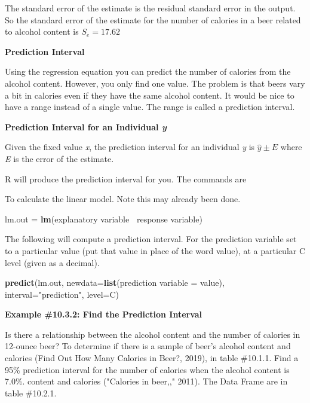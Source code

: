 \documentclass[
]{book}
\newenvironment{Shaded}{\begin{snugshade}}{\end{snugshade}}
\newcommand{\DataTypeTok}[1]{\textcolor[rgb]{0.13,0.29,0.53}{#1}}
\newcommand{\KeywordTok}[1]{\textcolor[rgb]{0.13,0.29,0.53}{\textbf{#1}}}
\newcommand{\NormalTok}[1]{#1}
\newcommand{\OperatorTok}[1]{\textcolor[rgb]{0.81,0.36,0.00}{\textbf{#1}}}
\newcommand{\StringTok}[1]{\textcolor[rgb]{0.31,0.60,0.02}{#1}}
\begin{document}
The standard error of the estimate is the residual standard error in the output. So the standard error of the estimate for the number of calories in a beer related to alcohol content is \(S_e=17.62\)

\textbf{Prediction Interval}

Using the regression equation you can predict the number of calories from the alcohol content. However, you only find one value. The problem is that beers vary a bit in calories even if they have the same alcohol content. It would be nice to have a range instead of a single value. The range is called a prediction interval.

\textbf{Prediction Interval for an Individual \emph{y} }

Given the fixed value \emph{x}, the prediction interval for an individual \emph{y} is \(\hat{y}\pm E\) where \emph{E} is the error of the estimate.

R will produce the prediction interval for you. The commands are

To calculate the linear model. Note this may already been done.

\begin{Shaded}
\begin{Highlighting}[]
\NormalTok{lm.out =}\StringTok{ }\KeywordTok{lm}\NormalTok{(explanatory variable}\OperatorTok{~}\StringTok{ }\NormalTok{response variable) }
\end{Highlighting}
\end{Shaded}

The following will compute a prediction interval. For the prediction variable set to a particular value (put that value in place of the word value), at a particular C level (given as a decimal).

\begin{Shaded}
\begin{Highlighting}[]
\KeywordTok{predict}\NormalTok{(lm.out, }\DataTypeTok{newdata=}\KeywordTok{list}\NormalTok{(prediction }\DataTypeTok{variable =}\NormalTok{ value), }\DataTypeTok{interval=}\StringTok{"prediction"}\NormalTok{, }\DataTypeTok{level=}\NormalTok{C) }
\end{Highlighting}
\end{Shaded}

\textbf{Example \#10.3.2: Find the Prediction Interval}

Is there a relationship between the alcohol content and the number of calories in 12-ounce beer? To determine if there is a sample of beer's alcohol content and calories (Find Out How Many Calories in Beer?, 2019), in table \#10.1.1. Find a 95\% prediction interval for the number of calories when the alcohol content is 7.0\%.
content and calories ("Calories in beer,," 2011). The Data Frame are in table \#10.2.1.
\end{document}
